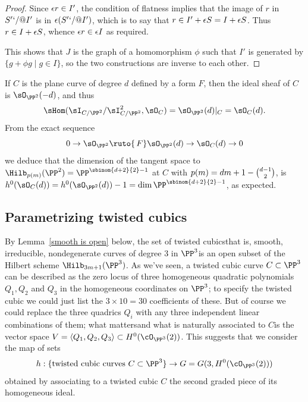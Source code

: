 \begin{proof}
Since $\eps r \in I'$, the condition of flatness implies
that the image of $r$ in $S'`/@I'$ is in $\eps(S'`/@I')$, which is to say
that $r \in I' + \eps S = I +\eps S$.
Thus $r \in  I + \eps S$, whence $\eps  r \in \eps I$ as required.

This shows that
$J$ is the graph of a homomorphism $\phi$ such that
 $I'$ is generated by $\{g+\phi g\mid g\in I\}$, so the two constructions
 are inverse to
each other.
\end{proof}

\begin{example}
\label{Hilb for plane curves-continued}
If $C$ is the
plane curve
%
of degree $d$ defined by a form $F$, then the
ideal sheaf of $C$ is $\sO_{\PP^2}(-d)$, and thus
$$
\sHom(\sI_{C/\PP^2}/\sI_{C/\PP^2}^2, \sO_{C}) = \sO_{\PP^2}(d)|_C =
\sO_C(d).
$$
From the exact sequence
$$
0\to\sO_{\PP^2}\ruto {\,F}\sO_{\PP^2}(d) \to\sO_C(d)\to 0
$$
we deduce that the dimension of the tangent space to
$\Hilb_{p(m)}(\PP^2)=\PP^{\sbinom{d+2}{2}-1}$  at $C$
with $p(m) = dm+1-\tbinom{d-1}{ 2}$,
is $h^0(\sO_C(d)) = h^0(\sO_{\PP^2}(d))-1 = \dim \PP^{\sbinom{d+2}{2}-1}$,
as expected.
\meshing
\end{example}

\subsection{Parametrizing twisted cubics}

By Lemma~\ref{smooth is open}
below, the set of twisted cubics\emdash that is, smooth, irreducible,
nondegenerate curves of degree 3 in $\PP^3$\emdash is an open subset
of the Hilbert scheme $\Hilb_{3m+1}(\PP^3)$. As we've seen, a twisted
%
cubic curve $C \subset \PP^3$ can be described as the zero locus of
three homogeneous quadratic polynomials $Q_1, Q_2$ and $Q_3$ in the
homogeneous coordinates on $\PP^3$; to specify the twisted cubic
we could just list the $3 \times 10 = 30$ coefficients of these. But
of course we could replace the three quadrics $Q_i$ with any three
independent linear combinations of them; what matters\emdash and what
is naturally associated to $C$\emdash is the vector space $V = \langle
Q_1, Q_2, Q_3 \rangle \subset H^0(\cO_{\PP^3}(2))$. This suggests that
we consider the map of sets
$$
h : \{ \text{twisted cubic curves } C \subset \PP^3 \} \to G = G(3,
H^0(\cO_{\PP^3}(2)))
$$
obtained by associating to a twisted cubic $C$ the second graded piece
of its homogeneous ideal.

